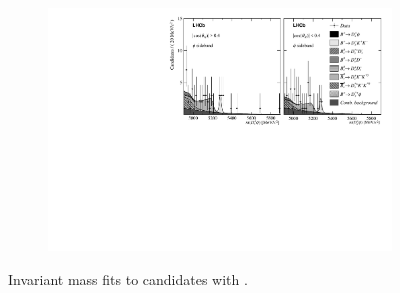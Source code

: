 \begin{figure}[!h]
\begin{subfigure}[t]{1.0\textwidth}
    \end{subfigure}
    \begin{subfigure}[t]{1.0\textwidth}
        \centering
        \includegraphics[width=1.0\textwidth]{figs/Appendix_FitCategories/canvas_DsPhiSide_Ds2PiPiPi_both_summed_splitHel_splitKKPi_s21_s21r1_s24_s26.pdf}\\
    \end{subfigure}
    \caption{Invariant mass fits to \decay{\Bp}{\Dsp\phiz} candidates with \decay{\Dsp}{\pip\pim\pip}.}
    \label{fig:app_fit_pipipi}
\end{figure}
